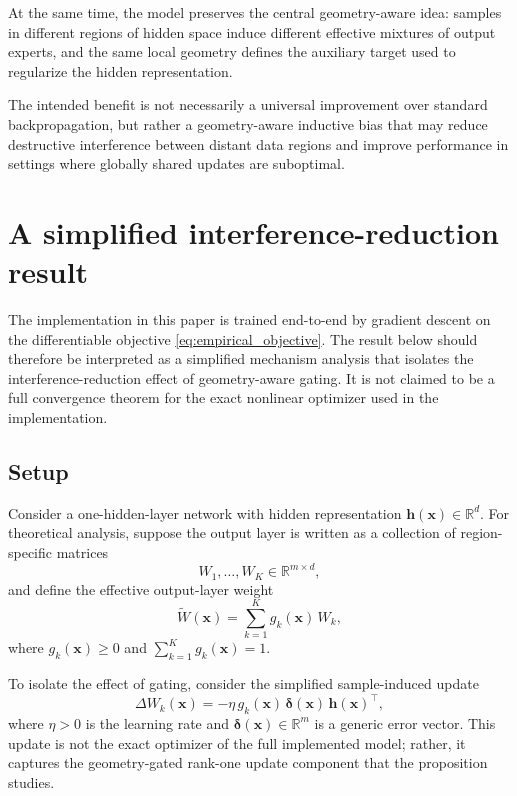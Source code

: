 \documentclass{article}
\theoremstyle{definition}
\theoremstyle{remark}
\def\RR{\mathbb{R}}
\begin{document}
At the same time, the model preserves the central geometry-aware idea: samples in different regions of hidden space induce different effective mixtures of output experts, and the same local geometry defines the auxiliary target used to regularize the hidden representation.

The intended benefit is not necessarily a universal improvement over standard backpropagation, but rather a geometry-aware inductive bias that may reduce destructive interference between distant data regions and improve performance in settings where globally shared updates are suboptimal.

\section{A simplified interference-reduction result}

The implementation in this paper is trained end-to-end by gradient descent on the differentiable objective \eqref{eq:empirical_objective}. The result below should therefore be interpreted as a simplified mechanism analysis that isolates the interference-reduction effect of geometry-aware gating. It is not claimed to be a full convergence theorem for the exact nonlinear optimizer used in the implementation.

\subsection{Setup}

Consider a one-hidden-layer network with hidden representation $\mathbf{h}(\mathbf{x})\in\RR^d$. For theoretical analysis, suppose the output layer is written as a collection of region-specific matrices
\[
W_1,\dots,W_K \in \RR^{m\times d},
\]
and define the effective output-layer weight
\begin{equation}
\widetilde{W}(\mathbf{x}) = \sum_{k=1}^{K} g_k(\mathbf{x})\,W_k,
\label{eq:theory_effW}
\end{equation}
where $g_k(\mathbf{x})\ge 0$ and $\sum_{k=1}^{K} g_k(\mathbf{x})=1$.

To isolate the effect of gating, consider the simplified sample-induced update
\begin{equation}
\Delta W_k(\mathbf{x})
=
-\eta\, g_k(\mathbf{x})\, \boldsymbol{\delta}(\mathbf{x})\,\mathbf{h}(\mathbf{x})^\top,
\label{eq:theory_update}
\end{equation}
where $\eta>0$ is the learning rate and $\boldsymbol{\delta}(\mathbf{x})\in\RR^{m}$ is a generic error vector. This update is not the exact optimizer of the full implemented model; rather, it captures the geometry-gated rank-one update component that the proposition studies.
\end{document}

